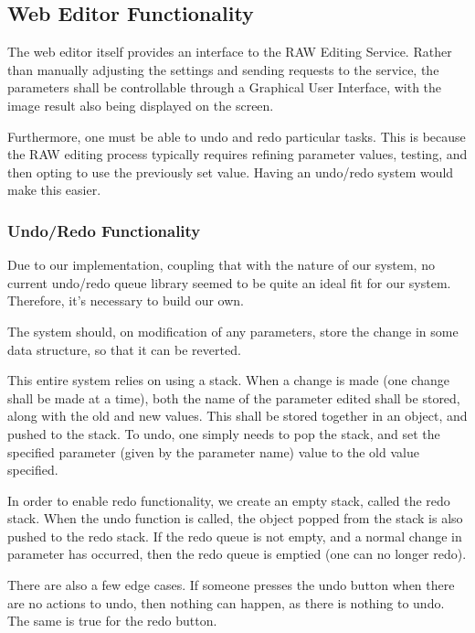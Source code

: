 \documentclass[10pt,a4paper]{article}
\begin{document}
\subsection{Web Editor Functionality}

The web editor itself provides an interface to the RAW Editing Service. Rather than
manually adjusting the settings and sending requests to the service, the parameters shall
be controllable through a Graphical User Interface, with the image result also being displayed
on the screen.

Furthermore, one must be able to undo and redo particular tasks. This is because the RAW editing
process typically requires refining parameter values, testing, and then opting to use the previously
set value. Having an undo/redo system would make this easier.

\subsubsection{Undo/Redo Functionality}
Due to our implementation, coupling that with the nature of our system, no current undo/redo queue library
seemed to be quite an ideal fit for our system. Therefore, it's necessary to build our own.

The system should, on modification of any parameters, store the change in some data structure,
so that it can be reverted.

This entire system relies on using a stack. When a change is made (one change shall be made at a time),
both the name of the parameter edited shall be stored, along with the old and new values. This shall be
stored together in an object, and pushed to the stack. To undo, one simply needs to pop the stack, and
set the specified parameter (given by the parameter name) value to the old value specified. 

In order to enable redo functionality, we create an empty stack, called the redo stack. When the undo function is called,
the object popped from the stack is also pushed to the redo stack. If the redo queue is not empty, and a normal change in parameter
has occurred, then the redo queue is emptied (one can no longer redo).

There are also a few edge cases. If someone presses the undo button when there are no actions to undo, then nothing can happen,
as there is nothing to undo. The same is true for the redo button.
\end{document}

